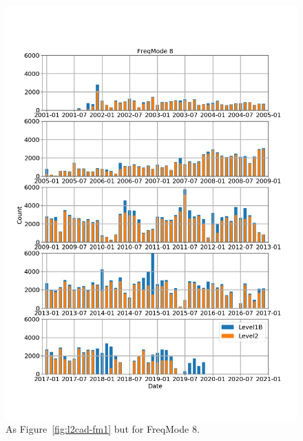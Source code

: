 \begin{figure}[t]
\centering
\includegraphics[width=1.0\textwidth]{l2cad-fm8.png}
\caption{As Figure~\ref{fig:l2cad-fm1} but for FreqMode 8.}
\label{fig:l2cad-fm8}
\end{figure}


